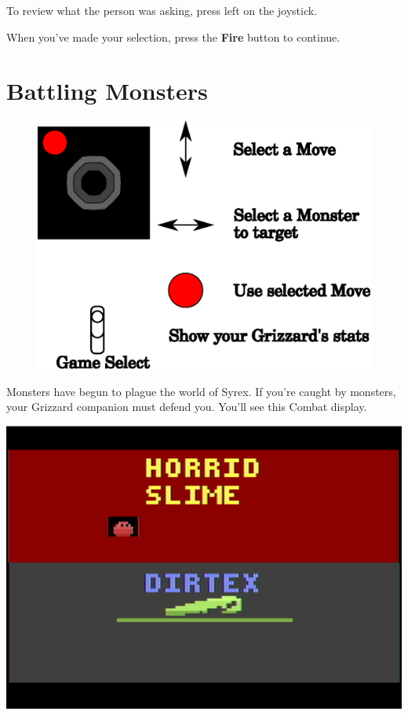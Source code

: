 \documentclass[9pt,twocolumn,openany,article]{memoir}
\begin{document}
To review  what  the  person  was  asking, press  left  on
the joystick.

When you've made your selection, press the \textbf{Fire} button to continue.


\section{Battling Monsters}

\begin{figure}[t]
  \begin{center}
    \includegraphics[width=2\columnwidth]{../Manual/CombatControls.eps}
  \end{center}
\end{figure}

Monsters have  begun to plague the  world of Syrex. If  you're caught by
monsters,  your Grizzard  companion  must defend  you.  You'll see  this
Combat display.

\begin{center}
  \includegraphics[width=.75\columnwidth]{../Manual/MonsterCombatNTSC.png}
\end{center}
\end{document}
